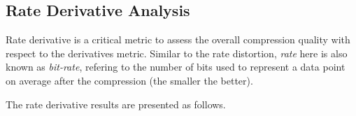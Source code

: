 \subsection{Rate Derivative Analysis}

Rate derivative is a critical metric to assess the overall compression quality with respect to the derivatives metric. Similar to the rate distortion, \emph{rate} here is also known as \emph{bit-rate}, refering to the number of bits used to represent a data point on average after the compression (the smaller the better). 





The rate derivative results are presented as follows.

